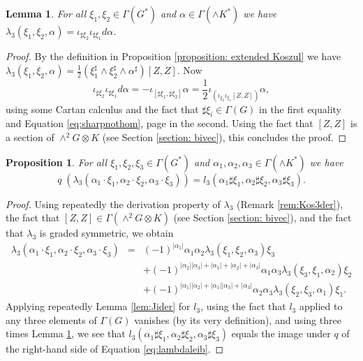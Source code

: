 \documentclass[11pt,thmsa]{amsart}
\newtheorem{lemma}[theorem]{Lemma}
\newtheorem{proposition}[theorem]{Proposition}
\theoremstyle{definition}
\begin{document}
\begin{lemma}\label{lem:Cartancalc}
For all $\xi_1,\xi_2\in \Gamma(G^*)$ and $\alpha \in \Gamma(\wedge K^*)$ we have
$\lambda_3(\xi_1,\xi_2,\alpha)
=\iota_{\sharp \xi_2}\iota_{\sharp \xi_1}d\alpha$.
\end{lemma}
\begin{proof}
By the definition in Proposition \ref{proposition: extended Koszul}  we have
$\lambda_3(\xi_1,\xi_2,\alpha)
=\frac{1}{2}(\xi_1^{\sharp}\wedge\xi_2^{\sharp}\wedge\alpha^{\sharp}) {[Z,Z]}$. 
Now
$$\iota_{\sharp \xi_2}\iota_{\sharp \xi_1}d\alpha=-\iota_{[\sharp \xi_1,\sharp \xi_2]}\alpha
=\frac{1}{2}\iota_{(\iota_{\xi_2}\iota_{\xi_1}[Z,Z])}\alpha,$$ 
using some Cartan calculus and the fact that $\sharp \xi_i\in \Gamma(G)$ in the first equality
and Equation \eqref{eq:sharpnothom}, page \pageref{eq:sharpnothom} in the second. Using the fact that $[Z,Z]$ is a section of $\wedge^2G\otimes K$ (see Section \ref{section: bivec}), this concludes the proof.
\end{proof}
 
\begin{proposition}\label{prop:interthree}
 For all $\xi_1,\xi_2,\xi_3\in \Gamma(G^*)$ and $\alpha_1,\alpha_2,\alpha_3\in \Gamma(\wedge K^*)$ we have
\begin{equation}\label{eq:q3}
q\;(\lambda_3(\alpha_1\cdot\xi_1,\alpha_2\cdot\xi_2,\alpha_3\cdot\xi_3))=l_3(\alpha_1 \sharp \xi_1,\alpha_2 \sharp \xi_2,\alpha_3 \sharp \xi_3).
\end{equation}
\end{proposition}

\begin{proof}
Using repeatedly the derivation property of $\lambda_3$ (Remark \ref{rem:Kos3der}),
the fact that $[Z,Z]\in \Gamma(\wedge^2G\otimes K)$ (see Section \ref{section: bivec}), 
 and the fact that $\lambda_3$ is graded symmetric, we obtain
\begin{eqnarray}\label{eq:lambdaleib}
\lambda_3(\alpha_1\cdot\xi_1,\alpha_2\cdot\xi_2,\alpha_3\cdot\xi_3)&=&
(-1)^{|\alpha_1|}\alpha_1\alpha_2\lambda_3(\xi_1,\xi_2,\alpha_3)\xi_3\\
&&+(-1)^{|\alpha_2||\alpha_3|+|\alpha_1|+|\alpha_2|+|\alpha_3|}
\alpha_1\alpha_3\lambda_3(\xi_3,\xi_1,\alpha_2)\xi_2\nonumber\\
&&+(-1)^{|\alpha_1||\alpha_2|+|\alpha_1||\alpha_3|+|\alpha_3|}
\alpha_2\alpha_3\lambda_3(\xi_2,\xi_3,\alpha_1)\xi_1.\nonumber
\end{eqnarray}
Applying repeatedly Lemma \ref{lem:Jider} for $l_3$, using the fact that  $l_3$ applied to any three elements of $\Gamma(G)$ vanishes (by its very definition), and using three times Lemma \ref{lem:Cartancalc},
 we see that 
$l_3(\alpha_1 \sharp \xi_1,\alpha_2 \sharp \xi_2,\alpha_3 \sharp \xi_3)$ equals the image under $q$ of the right-hand side of Equation \eqref{eq:lambdaleib}. 
\end{proof}
 
\end{document}
